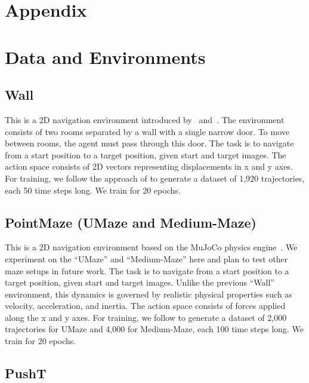 \appendix

\section*{Appendix}


\section{Data and Environments}
\label{app:datasets}

\subsection{Wall}

This is a 2D navigation environment introduced by~\citet{dinowm} and~\citet{sobal2025learning}. The environment consists of two rooms separated by a wall with a single narrow door. To move between rooms, the agent must pass through this door. The task is to navigate from a start position to a target position, given start and target images. The action space consists of 2D vectors representing displacements in x and y axes. For training, we follow the approach of \citet{dinowm} to generate a dataset of 1,920 trajectories, each 50 time steps long. We train for 20 epochs.

\subsection{PointMaze (UMaze and Medium-Maze)}
\label{appendix:pointmze}

This is a 2D navigation environment based on the MuJoCo physics engine~\citep{fu2020d4rl}. We experiment on the ``UMaze'' and ``Medium-Maze'' here and plan to test other maze setups in future work. The task is to navigate from a start position to a target position, given start and target images. Unlike the previous ``Wall'' environment, this dynamics is governed by realistic physical properties such as velocity, acceleration, and inertia. The action space consists of forces applied along the x and y axes. For training, we follow \citet{dinowm} to generate a dataset of 2,000 trajectories for UMaze and 4,000 for Medium-Maze, each 100 time steps long. We train for 20 epochs.

\subsection{PushT}
\label{appendix:pointmze}


